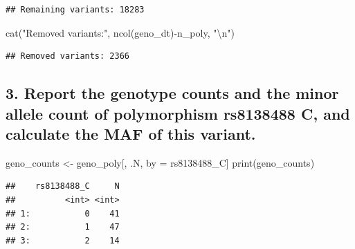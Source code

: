 \documentclass[
]{article}
\newenvironment{Shaded}{\begin{snugshade}}{\end{snugshade}}
\newcommand{\FunctionTok}[1]{\textcolor[rgb]{0.00,0.00,0.00}{#1}}
\newcommand{\NormalTok}[1]{#1}
\newcommand{\OtherTok}[1]{\textcolor[rgb]{0.56,0.35,0.01}{#1}}
\newcommand{\SpecialCharTok}[1]{\textcolor[rgb]{0.00,0.00,0.00}{#1}}
\newcommand{\StringTok}[1]{\textcolor[rgb]{0.31,0.60,0.02}{#1}}
\begin{document}
\begin{verbatim}
## Remaining variants: 18283
\end{verbatim}

\begin{Shaded}
\begin{Highlighting}[]
\FunctionTok{cat}\NormalTok{(}\StringTok{"Removed variants:"}\NormalTok{, }\FunctionTok{ncol}\NormalTok{(geno\_dt)}\SpecialCharTok{{-}}\NormalTok{n\_poly, }\StringTok{"}\SpecialCharTok{\textbackslash{}n}\StringTok{"}\NormalTok{)}
\end{Highlighting}
\end{Shaded}

\begin{verbatim}
## Removed variants: 2366
\end{verbatim}

\hypertarget{report-the-genotype-counts-and-the-minor-allele-count-of-polymorphism-rs8138488-c-and-calculate-the-maf-of-this-variant.}{%
\subsection{3. Report the genotype counts and the minor allele count of
polymorphism rs8138488 C, and calculate the MAF of this
variant.}\label{report-the-genotype-counts-and-the-minor-allele-count-of-polymorphism-rs8138488-c-and-calculate-the-maf-of-this-variant.}}

\begin{Shaded}
\begin{Highlighting}[]
\NormalTok{geno\_counts }\OtherTok{\textless{}{-}}\NormalTok{ geno\_poly[, .N, by }\OtherTok{=}\NormalTok{ rs8138488\_C]}
\FunctionTok{print}\NormalTok{(geno\_counts)}
\end{Highlighting}
\end{Shaded}

\begin{verbatim}
##    rs8138488_C     N
##          <int> <int>
## 1:           0    41
## 2:           1    47
## 3:           2    14
\end{verbatim}
\end{document}

